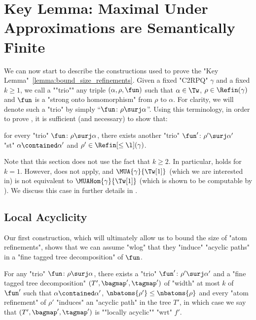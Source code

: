 \section{\AP{}Key Lemma: Maximal Under Approximations are Semantically Finite}
\label{sec:proof-key-lemma}

\AP We can now start to describe the constructions used to prove the "Key Lemma"~\ref{lemma:bound_size_refinements}. Given a fixed "C2RPQ" $\gamma$ and a fixed $k \geq 1$,
we call a ""trio"" any triple $(\alpha,\rho,\fun)$ such that 
$\alpha \in \Tw$,
$\rho \in \Refin(\gamma)$ and 
$\fun$ is a "strong onto homomorphism" from $\rho$ to $\alpha$. 
For clarity, we will denote such a "trio" by simply ``$\fun\colon \rho \surj \alpha$''. 
Using this terminology, in order to prove , it is sufficient (and necessary) to show that:
\begin{center}
	for every "trio" $\fun\colon \rho \surj \alpha$,
	there exists another "trio" $\fun'\colon \rho' \surj \alpha'$\\
	"st" $\alpha \contained \alpha'$ and $\rho'\in \Refin[\leq \l](\gamma)$.
\end{center}

\begin{remark}
	\AP\label{rk:key-lemma-tw1}
	Note that this section does not use the fact that $k \geq 2$. In particular,
	 holds for $k=1$. However,
	 does not apply,
	and $\MUA{\gamma}{\Tw[1]}$ (which we are interested in)
	is not equivalent to $\MUAHom{\gamma}{\Tw[1]}$ (which is shown to be computable by ). We discuss this case in further details in .
\end{remark}

\subsection{\AP{}Local Acyclicity}
Our first construction, which will ultimately allow us to bound the size of "atom refinements",
shows that we can assume "wlog" that they "induce" "acyclic paths" in a "fine tagged 
tree decomposition" of $\fun$.

\begin{lemma}
    \AP\label{lemma:locally_acyclic_treedec}
    For any "trio" $\fun\colon \rho \surj \alpha$, there exists a "trio" $\fun'\colon \rho' \surj \alpha'$ and a "fine tagged tree decomposition" $(T', \bagmap', \tagmap')$ of "width" at most 
    $k$ of $\fun'$ such that
    $\alpha \contained \alpha'$, $\nbatoms{\rho'} \leq \nbatoms{\rho}$ and every "atom refinement" of
    $\rho'$ "induces" an "acyclic path" in the tree $T'$, in which case
    we say that $(T', \bagmap', \tagmap')$ is ""locally acyclic""
	"wrt" $f'$.
\end{lemma}

